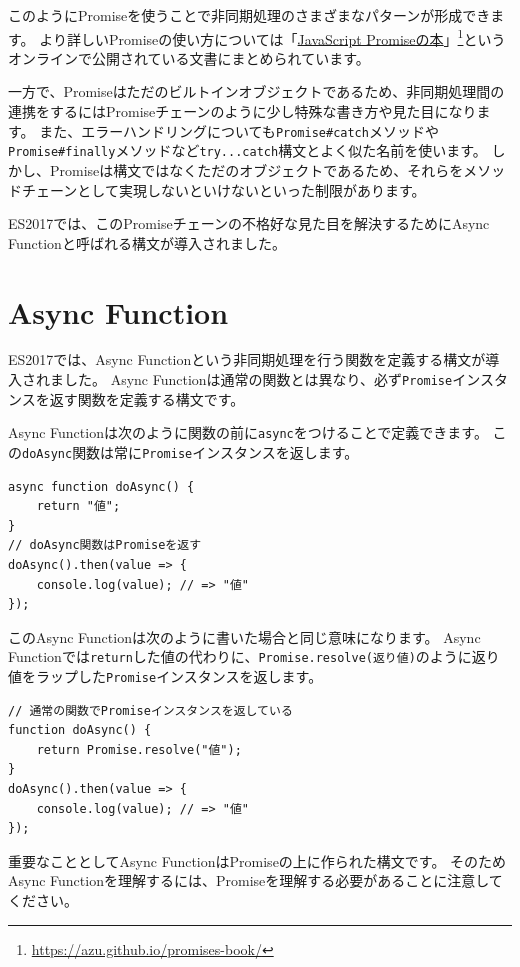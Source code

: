 このようにPromiseを使うことで非同期処理のさまざまなパターンが形成できます。
より詳しいPromiseの使い方については「\href{https://azu.github.io/promises-book/}{JavaScript
Promiseの本}」\footnote{\url{https://azu.github.io/promises-book/}}というオンラインで公開されている文書にまとめられています。

一方で、Promiseはただのビルトインオブジェクトであるため、非同期処理間の連携をするにはPromiseチェーンのように少し特殊な書き方や見た目になります。
また、エラーハンドリングについても\texttt{Promise\#catch}メソッドや\texttt{Promise\#finally}メソッドなど\texttt{try...catch}構文とよく似た名前を使います。
しかし、Promiseは構文ではなくただのオブジェクトであるため、それらをメソッドチェーンとして実現しないといけないといった制限があります。

ES2017では、このPromiseチェーンの不格好な見た目を解決するためにAsync
Functionと呼ばれる構文が導入されました。

\hypertarget{async-function}{%
\section[Async Function]{Async Function\protect{}}\label{async-function}}

ES2017では、Async
Functionという非同期処理を行う関数を定義する構文が導入されました。 Async
Functionは通常の関数とは異なり、必ず\texttt{Promise}インスタンスを返す関数を定義する構文です。

Async
Functionは次のように関数の前に\texttt{async}をつけることで定義できます。
この\texttt{doAsync}関数は常に\texttt{Promise}インスタンスを返します。

\begin{lstlisting}
async function doAsync() {
    return "値";
}
// doAsync関数はPromiseを返す
doAsync().then(value => {
    console.log(value); // => "値"
});
\end{lstlisting}

このAsync Functionは次のように書いた場合と同じ意味になります。 Async
Functionでは\texttt{return}した値の代わりに、\texttt{Promise.resolve(返り値)}のように返り値をラップした\texttt{Promise}インスタンスを返します。

\begin{lstlisting}
// 通常の関数でPromiseインスタンスを返している
function doAsync() {
    return Promise.resolve("値");
}
doAsync().then(value => {
    console.log(value); // => "値"
});
\end{lstlisting}

重要なこととしてAsync FunctionはPromiseの上に作られた構文です。
そのためAsync
Functionを理解するには、Promiseを理解する必要があることに注意してください。

